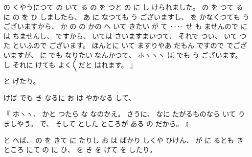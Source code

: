 の
%
くやうにつて
の
いて
る
の
を
つと%
の
に
し
けられました。
%
の
を
つて
る
に
の
を
ひ
しましたら、
%
あ
に
なつても
う
ございますし、
%
を
かなくつても
う
ございますから、
%
か
の
の
かの
%
へ
いて
きたい
が
て
‥‥
せ
も
ませんので
には
ちませんし、
%
ですから、
%
いては
さいますまいつて、
%
それで
つい、
%
いて
つた
といふので
ございます。
%
ほんとに
いて
ますりやあ
だもん
ですので
でございますが、
%
に
でも
なりたい
なんかつて、
%
ホヽヽヽ
ぼ
でも
う
ございます。
%
し
それに
けても
よく〳〵だと
はれます。
』

%
と
げたり。

%
けば
でも
き
なるに
お
は
やかなる
して、

%
『
ホヽヽ、
%
かと
つたら
な
なのかえ。
%
さうに、
%
なに
たがるものなら
いて
りましやう。
%
で、%
%
そして
とした
ところが
ある
の
だから。
』

%
と
へば、
%
の
を
きて
に
たりし
お
は
ばかり
しくや
ひけん、
%
が
に
るとも
き
ところ
にて
の
に
ひ、
%
を
き
を
げて
を
したり。

